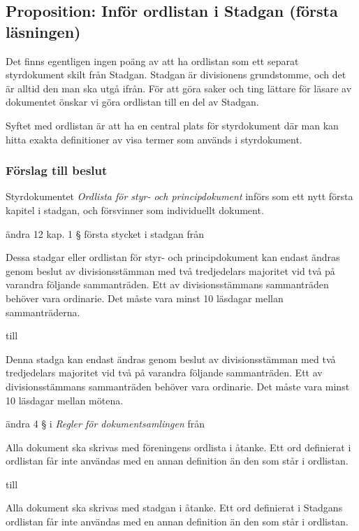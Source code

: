 \documentclass[protokoll]{dvd}
\begin{document}
\subsection{Proposition: Inför ordlistan i Stadgan (första läsningen)}

Det finns egentligen ingen poäng av att ha ordlistan som ett separat styrdokument skilt från Stadgan.
Stadgan är divisionens grundstomme, och det är alltid den man ska utgå ifrån.
För att göra saker och ting lättare för läsare av dokumentet önskar vi göra ordlistan till en del av Stadgan.

Syftet med ordlistan är att ha en central plats för styrdokument där man kan hitta exakta definitioner av visa termer som används i styrdokument.

\subsubsection*{Förslag till beslut}

\begin{attsatser}
	\item Styrdokumentet \emph{Ordlista för styr- och principdokument} införs som ett nytt första kapitel i stadgan, och försvinner som individuellt dokument.

	\item ändra 12 kap. 1 § första stycket i stadgan från

	\begin{displayquote}
		Dessa stadgar eller ordlistan för styr- och principdokument kan endast ändras genom beslut av divisionsstämman med två tredjedelars majoritet vid två på varandra följande sammanträden.
		Ett av divisionsstämmans sammanträden behöver vara ordinarie.
		Det måste vara minst 10 läsdagar mellan sammanträderna.
	\end{displayquote}

	till

	\begin{displayquote}
		Denna stadga kan endast ändras genom beslut av divisionsstämman med två tredjedelars majoritet vid två på varandra följande sammanträden.
		Ett av divisionsstämmans sammanträden behöver vara ordinarie.
		Det måste vara minst 10 läsdagar mellan mötena.
	\end{displayquote}

	\item ändra 4 § i \emph{Regler för dokumentsamlingen} från

	\begin{displayquote}
		Alla dokument ska skrivas med föreningens ordlista i åtanke.
		Ett ord definierat i ordlistan får inte användas med en annan definition än den som står i ordlistan.
	\end{displayquote}

	till

	\begin{displayquote}
        Alla dokument ska skrivas med stadgan i åtanke.
        Ett ord definierat i Stadgans ordlistan får inte användas med en annan definition än den som står i ordlistan.
    \end{displayquote}
\end{attsatser}
\end{document}
